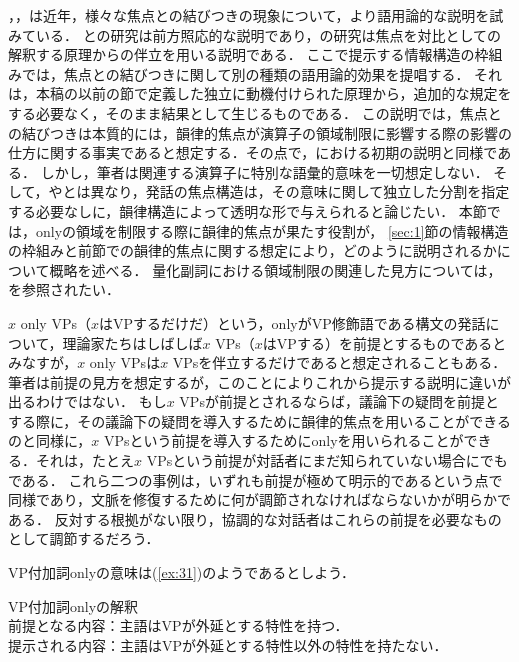 \documentclass{goken}
\newcommand{\ori}[1]{\noindent\textcolor[gray]{0.7}{\fontsize{8pt}{8pt}\selectfont{\textsf{(p.~#1)}}} }
\begin{document}
\citet{Rooth1992a}，\citet{vonFintel1994,vonFintel2004}，\citet{Schwarzschild1994a,Schwarzschild1994b}は近年，様々な焦点との結びつきの現象について，より語用論的な説明を試みている．
\citeauthor{Rooth1992a}と\citeauthor{vonFintel1994}の研究は前方照応的な説明であり，\citeauthor{Schwarzschild1994a}の研究は焦点を対比としての解釈する原理からの伴立を用いる説明である．
ここで提示する情報構造の枠組みでは，焦点との結びつきに関して別の種類の語用論的効果を提唱する．
それは，本稿の以前の節で定義した独立に動機付けられた原理から，追加的な規定をする必要なく，そのまま結果として生じるものである．
この説明では，焦点との結びつきは本質的には，韻律的焦点が演算子の領域制限に影響する際の影響の仕方に関する事実であると想定する．その点で，\citealt{Rooth1985}における初期の説明と同様である．
しかし，筆者は関連する演算子に特別な語彙的意味を一切想定しない．
そして，\citeauthor{vonFintel1994}や\citeauthor{Krifka1992}とは異なり，発話の焦点構造は，その意味に関して独立した分割を指定する必要なしに，韻律構造によって透明な形で与えられると論じたい．
本節では，onlyの領域を制限する際に韻律的焦点が果たす役割が，\ori{38}\ref{sec:1}節の情報構造の枠組みと前節での韻律的焦点に関する想定により，どのように説明されるかについて概略を述べる．
量化副詞における領域制限の関連した見方については，\citealt{Calcagno1996}を参照されたい．

$x$ only VPs（$x$はVPするだけだ）という，onlyがVP修飾語である構文の発話について，理論家たちはしばしば$x$ VPs（$x$はVPする）を前提とするものであるとみなすが，$x$ only VPsは$x$ VPsを伴立するだけであると想定されることもある．
筆者は前提の見方を想定するが，このことによりこれから提示する説明に違いが出るわけではない．
もし$x$ VPsが前提とされるならば，議論下の疑問を前提とする際に，その議論下の疑問を導入するために韻律的焦点を用いることができるのと同様に，$x$ VPsという前提を導入するためにonlyを用いられることができる．それは，たとえ$x$ VPsという前提が対話者にまだ知られていない場合にでもである．
これら二つの事例は，いずれも前提が極めて明示的であるという点で同様であり，文脈を修復するために何が調節されなければならないかが明らかである．
反対する根拠がない限り，協調的な対話者はこれらの前提を必要なものとして調節するだろう．

VP付加詞onlyの意味は(\ref{ex:31})のようであるとしよう．

\pagebreak
\begin{exe}
	\ex\label{ex:31}  VP付加詞onlyの解釈\\
	\textsf{前提となる内容}：主語はVPが外延とする特性を持つ．\\
	\textsf{提示される内容}：主語はVPが外延とする特性以外の特性を持たない．
\end{exe}
\end{document}
